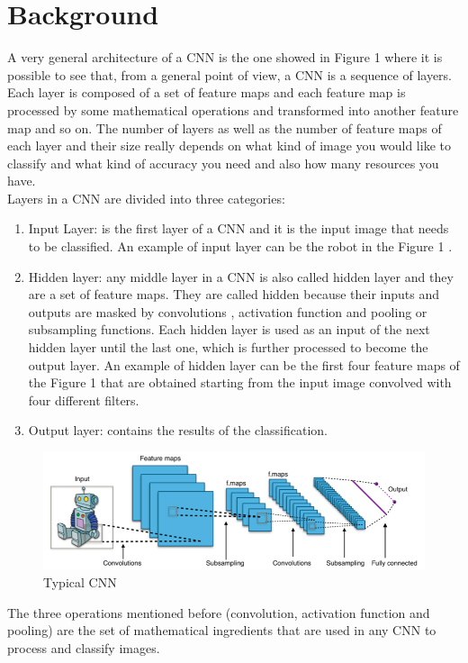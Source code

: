 \documentclass[a4paper]{report}
\begin{document}
\section{Background}
A very general architecture of a CNN is the one showed in Figure 1 where it is possible to see that, from a general point of view, a CNN is a sequence of layers.
Each layer is composed of a set of feature maps and each feature map is processed by some mathematical operations and transformed into another feature map and so on.
The number of layers as well as the number of feature maps of each layer and their size really depends on what kind of image you would like to classify and what kind of accuracy you need and also how many resources you have.\\
Layers in a CNN are divided into three categories:
\begin{enumerate}
\item Input Layer: is the first layer of a CNN and it is the input image that needs to be classified.
 An example of input layer can be the robot in the Figure 1 .
\item Hidden layer: any middle layer in a CNN is also called hidden layer and they are a set of feature maps.
They are called hidden because their inputs and outputs are masked by convolutions , activation function and pooling or subsampling functions.
Each hidden layer is used as an input of the next hidden layer until the last one, which is further processed to become the output layer.
An example of hidden layer can be the first four feature maps of the Figure 1 that are obtained starting from the input image convolved with four different filters.
\item Output layer: contains the results of the classification.
\end{enumerate}

\begin{figure}[h]
\centering
\includegraphics[width=0.8\columnwidth]{docs/Typical_cnn.png} 
\caption{Typical CNN}
\label{fig_typicalCNN}
\end{figure}

The three operations mentioned before (convolution, activation function and pooling) are the set of mathematical ingredients that are used in any CNN to process and classify images.
\end{document}
